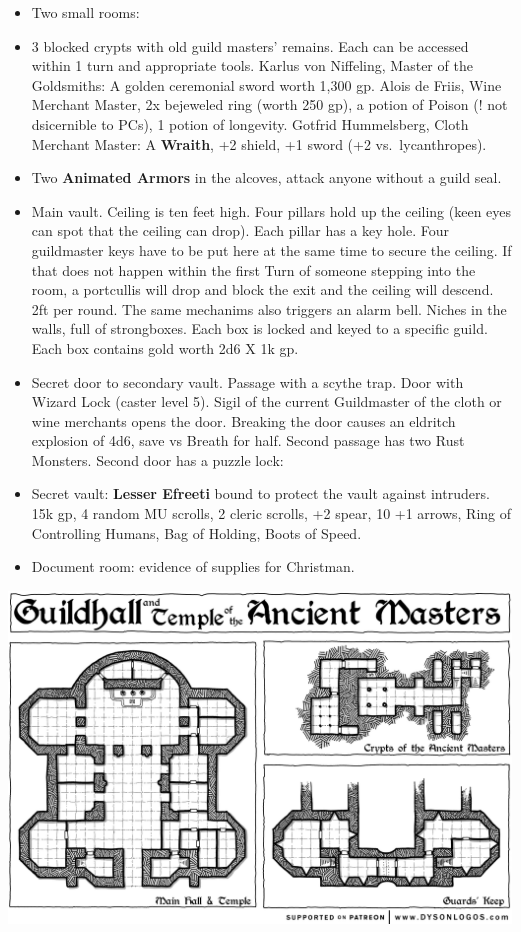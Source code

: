 \documentclass[
]{book}
\begin{document}
\begin{itemize}
\item
  Two small rooms:
\item
  3 blocked crypts with old guild masters' remains. Each can be accessed within 1 turn and appropriate tools. Karlus von Niffeling, Master of the Goldsmiths: A golden ceremonial sword worth 1,300 gp. Alois de Friis, Wine Merchant Master, 2x bejeweled ring (worth 250 gp), a potion of Poison (! not dsicernible to PCs), 1 potion of longevity. Gotfrid Hummelsberg, Cloth Merchant Master: A \textbf{Wraith}, +2 shield, +1 sword (+2 vs.~lycanthropes).
\item
  Two \textbf{Animated Armors} in the alcoves, attack anyone without a guild seal.
\item
  Main vault. Ceiling is ten feet high. Four pillars hold up the ceiling (keen eyes can spot that the ceiling can drop). Each pillar has a key hole. Four guildmaster keys have to be put here at the same time to secure the ceiling. If that does not happen within the first Turn of someone stepping into the room, a portcullis will drop and block the exit and the ceiling will descend. 2ft per round. The same mechanims also triggers an alarm bell. Niches in the walls, full of strongboxes. Each box is locked and keyed to a specific guild. Each box contains gold worth 2d6 X 1k gp.
\item
  Secret door to secondary vault. Passage with a scythe trap. Door with Wizard Lock (caster level 5). Sigil of the current Guildmaster of the cloth or wine merchants opens the door. Breaking the door causes an eldritch explosion of 4d6, save vs Breath for half. Second passage has two Rust Monsters. Second door has a puzzle lock:
\item
  Secret vault: \textbf{Lesser Efreeti} bound to protect the vault against intruders. 15k gp, 4 random MU scrolls, 2 cleric scrolls, +2 spear, 10 +1 arrows, Ring of Controlling Humans, Bag of Holding, Boots of Speed.
\item
  Document room: evidence of supplies for Christman.
\end{itemize}

\begin{center}\includegraphics[width=1\linewidth]{graphics/guild-temple-600dpi-patreon} \end{center}
\end{document}
